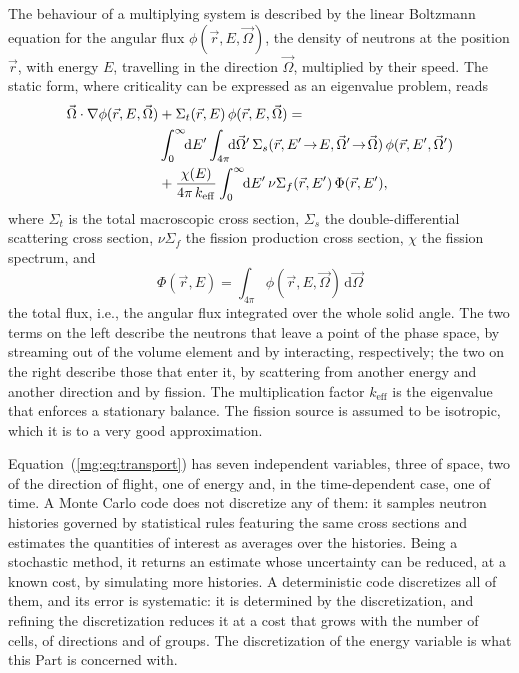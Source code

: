 The behaviour of a multiplying system is described by the linear
Boltzmann equation for the angular flux $\phi(\vec{r},E,\vec{\Omega})$, the
density of neutrons at the position $\vec{r}$, with energy $E$, travelling in
the direction $\vec{\Omega}$, multiplied by their speed. The static form, where
criticality can be expressed as an eigenvalue problem, reads
\cite{SPH_book_Bell_Glasstone}
%
\begin{align}
  \vec{\Omega}\cdot\nabla\phi(\vec{r},E,\vec{\Omega})
  &+ \Sigma_t(\vec{r},E)\,\phi(\vec{r},E,\vec{\Omega}) = \notag \\
  &\int_{0}^{\infty}\!\!\mathrm{d}E'\int_{4\pi}\!\!\mathrm{d}\vec{\Omega}'\,
   \Sigma_s(\vec{r},E'\!\to\!E,\vec{\Omega}'\!\to\!\vec{\Omega})\,
   \phi(\vec{r},E',\vec{\Omega}') \notag \\
  &+ \frac{\chi(E)}{4\pi\,k_{\mathrm{eff}}}
   \int_{0}^{\infty}\!\!\mathrm{d}E'\,
   \nu\Sigma_f(\vec{r},E')\,\Phi(\vec{r},E'),
  \label{mg:eq:transport}
\end{align}
%
where $\Sigma_t$ is the total macroscopic cross section, $\Sigma_s$ the
double-differential scattering cross section, $\nu\Sigma_f$ the fission
production cross section, $\chi$ the fission spectrum, and
%
\begin{equation}
  \Phi(\vec{r},E) = \int_{4\pi}\phi(\vec{r},E,\vec{\Omega})\,\mathrm{d}\vec{\Omega}
  \label{mg:eq:totalflux}
\end{equation}
%
the total flux, i.e., the angular flux integrated over the whole solid angle.
The two terms on the left describe the neutrons that leave a point of the phase
space, by streaming out of the volume element and by interacting, respectively;
the two on the right describe those that enter it, by scattering from another
energy and another direction and by fission. The multiplication factor
$k_{\mathrm{eff}}$ is the eigenvalue that enforces a stationary balance. The
fission source is assumed to be isotropic, which it is to a very good
approximation.

Equation~(\ref{mg:eq:transport}) has seven independent variables, three of
space, two of the direction of flight, one of energy and, in the time-dependent case,
one of time.
A Monte Carlo code does not discretize any of them: it samples neutron histories
governed by statistical rules featuring the same cross sections and estimates
the quantities of interest as averages over the histories. Being a stochastic
method, it returns an estimate whose uncertainty can be reduced, at a known
cost, by simulating more histories. A deterministic code discretizes all
of them, and its error is systematic: it is determined by the discretization,
and refining the discretization reduces it at a cost that grows with the number
of cells, of directions and of groups. The discretization of the
energy variable is what this Part is concerned with.

